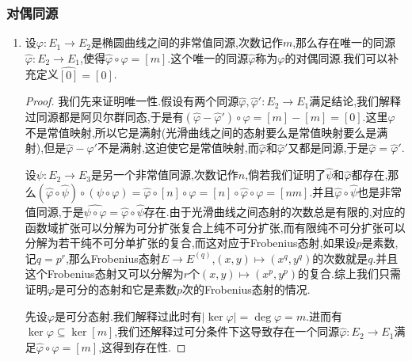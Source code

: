 \subsubsection{对偶同源}
\begin{enumerate}
	\item 设$\varphi:E_1\to E_2$是椭圆曲线之间的非常值同源,次数记作$m$,那么存在唯一的同源$\widehat{\varphi}:E_2\to E_1$,使得$\widehat{\varphi}\circ\varphi=[m]$.这个唯一的同源$\widehat{\varphi}$称为$\varphi$的对偶同源.我们可以补充定义$\widehat{[0]}=[0]$.
	\begin{proof}
		
		我们先来证明唯一性.假设有两个同源$\widehat{\varphi},\widehat{\varphi}':E_2\to E_1$满足结论,我们解释过同源都是阿贝尔群同态,于是有$(\widehat{\varphi}-\widehat{\varphi}')\circ\varphi=[m]-[m]=[0]$.这里$\varphi$不是常值映射,所以它是满射(光滑曲线之间的态射要么是常值映射要么是满射),但是$\widehat{\varphi}-\widehat{\varphi}'$不是满射,这迫使它是常值映射,而$\widehat{\varphi}$和$\widehat{\varphi}'$又都是同源,于是$\widehat{\varphi}=\widehat{\varphi}'$.
		
		\qquad
		
		设$\psi:E_2\to E_3$是另一个非常值同源,次数记作$n$,倘若我们证明了$\widehat{\psi}$和$\widehat{\varphi}$都存在,那么$(\widehat{\varphi}\circ\widehat{\psi})\circ(\psi\circ\varphi)=\widehat{\varphi}\circ[n]\circ\varphi=[n]\circ\widehat{\varphi}\circ\varphi=[nm]$.并且$\widehat{\varphi}\circ\widehat{\psi}$也是非常值同源,于是$\widehat{\psi\circ\varphi}=\widehat{\varphi}\circ\widehat{\psi}$存在.由于光滑曲线之间态射的次数总是有限的,对应的函数域扩张可以分解为可分扩张复合上纯不可分扩张,而有限纯不可分扩张可以分解为若干纯不可分单扩张的复合,而这对应于Frobenius态射,如果设$p$是素数,记$q=p^r$,那么Frobenius态射$E\to E^{(q)}$,$(x,y)\mapsto(x^q,y^q)$的次数就是$q$.并且这个Frobenius态射又可以分解为$r$个$(x,y)\mapsto(x^p,y^p)$的复合.综上我们只需证明$\varphi$是可分的态射和它是素数$p$次的Frobenius态射的情况.
		
		\qquad
		
		先设$\varphi$是可分态射.我们解释过此时有$|\ker\varphi|=\deg\varphi=m$.进而有$\ker\varphi\subseteq\ker[m]$,我们还解释过可分条件下这导致存在一个同源$\widehat{\varphi}:E_2\to E_1$满足$\widehat{\varphi}\circ\varphi=[m]$,这得到存在性.
		
		\qquad
		

\end{proof}
\end{enumerate}
